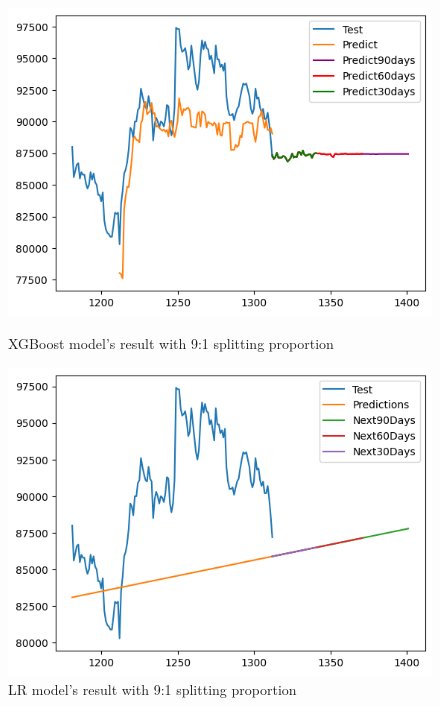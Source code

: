 \documentclass{ieeeojies}
\begin{document}
\begin{figure}[H]
    \centering
    \begin{minipage}{0.45\linewidth}
        \centering
        \includegraphics[width=\linewidth]{bibliography/diagram/XGBoost-VCB.png}
        \caption{XGBoost model’s result with 9:1 splitting proportion}
        \label{fig:XGBoost-VCB}
    \end{minipage}
    \hfill
    \begin{minipage}{0.45\linewidth}
        \centering
        \includegraphics[width=\linewidth]{bibliography/diagram/LR-VCB.png}
        \caption{LR model’s result with 9:1 splitting proportion}
        \label{fig:LR-VCB}
    \end{minipage}
\end{figure}
\end{document}
